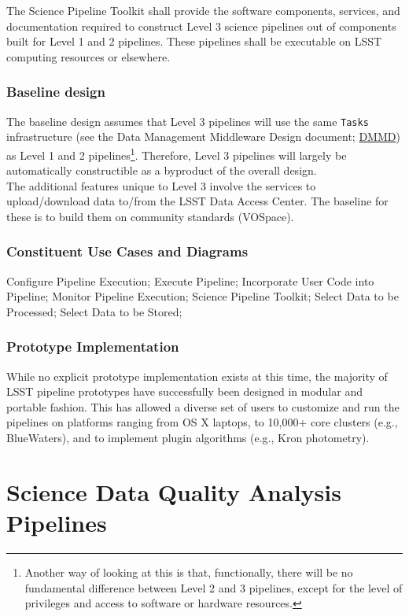 \documentclass[12pt]{article}
\newcommand{\ds}[2]{{\color{blue} \href{https://docushare.lsstcorp.org/docushare/dsweb/Get/#1}{#2}}\xspace}
\newcommand{\DMMD}{\ds{LDM-152}{DMMD}}
\begin{document}
The Science Pipeline Toolkit shall provide the software components, services, and documentation required to construct Level 3 science pipelines out of components built for Level 1 and 2 pipelines. These pipelines shall be executable on LSST computing resources or elsewhere.

\subsubsection{Baseline design}

The baseline design assumes that Level 3 pipelines will use the same {\tt Tasks} infrastructure (see the Data Management Middleware Design document; \DMMD) as Level 1 and 2 pipelines\footnote{Another way of looking at this is that, functionally, there will be no fundamental difference between Level 2 and 3 pipelines, except for the level of privileges and access to software or hardware resources.}. Therefore, Level 3 pipelines will largely be automatically constructible as a byproduct of the overall design.
\\

The additional features unique to Level 3 involve the services to upload/download data to/from the LSST Data Access Center. The baseline for these is to build them on community standards (VOSpace).

\subsubsection{Constituent Use Cases and Diagrams}

Configure Pipeline Execution; Execute Pipeline; Incorporate User Code into Pipeline; Monitor Pipeline Execution; Science Pipeline Toolkit; Select Data to be Processed; Select Data to be Stored;

\subsubsection{Prototype Implementation}

While no explicit prototype implementation exists at this time, the majority of LSST pipeline prototypes have successfully been designed in modular and portable fashion. This has allowed a diverse set of users to customize and run the pipelines on platforms ranging from OS X laptops, to 10,000+ core clusters (e.g., BlueWaters), and to implement plugin algorithms (e.g., Kron photometry).

\clearpage

\section{Science Data Quality Analysis Pipelines}
\end{document}
